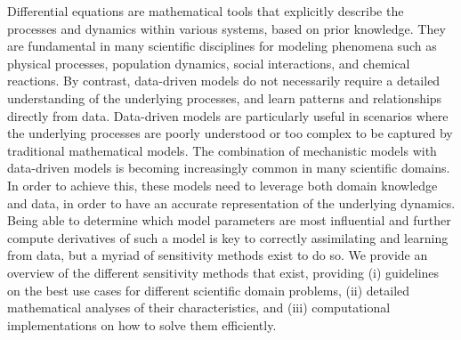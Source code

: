 Differential equations are mathematical tools that explicitly describe the processes and dynamics within various systems, based on prior knowledge. They are fundamental in many scientific disciplines for modeling phenomena such as physical processes, population dynamics, social interactions, and chemical reactions.
By contrast, data-driven models do not necessarily require a detailed understanding of the underlying processes, and learn patterns and relationships directly from data. Data-driven models are particularly useful in scenarios where the underlying processes are poorly understood or too complex to be captured by traditional mathematical models.
The combination of mechanistic models with data-driven models is becoming increasingly common in many scientific domains. 
In order to achieve this, these models need to leverage both domain knowledge and data, in order to have an accurate representation of the underlying dynamics. 
Being able to determine which model parameters are most influential and further compute derivatives of such a model is key to correctly assimilating and learning from data, but a myriad of sensitivity methods exist to do so. 
We provide an overview of the different sensitivity methods that exist, providing (i) guidelines on the best use cases for different scientific domain problems, (ii) detailed mathematical analyses of their characteristics, and (iii) computational implementations on how to solve them efficiently. 
